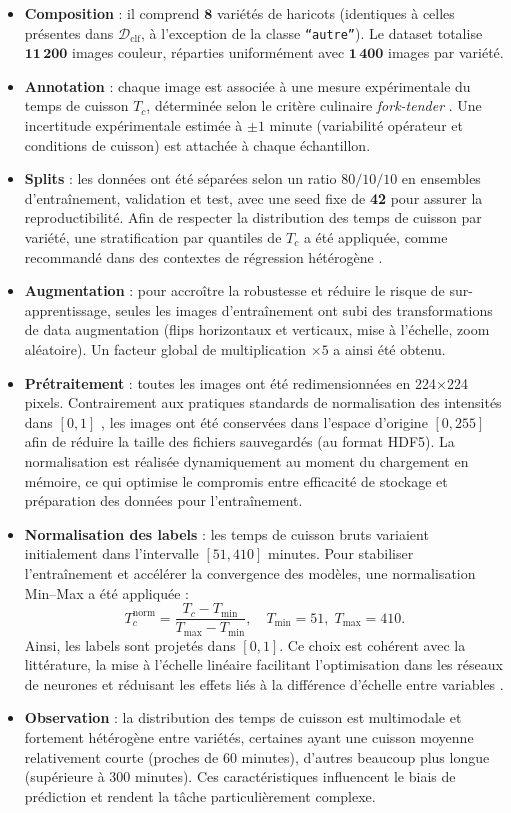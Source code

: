 \begin{itemize}
	\item \textbf{Composition} : il comprend \(\mathbf{8}\) variétés de haricots (identiques à celles présentes dans \(\mathcal{D}_{\text{clf}}\), à l’exception de la classe \texttt{``autre''}). Le dataset totalise \(\mathbf{11\,200}\) images couleur, réparties uniformément avec \(\mathbf{1\,400}\) images par variété.
	\item \textbf{Annotation} : chaque image est associée à une mesure expérimentale du temps de cuisson \(T_c\), déterminée selon le critère culinaire \emph{fork-tender} \cite{hall2017beanquality}. Une incertitude expérimentale estimée à \(\pm 1\) minute (variabilité opérateur et conditions de cuisson) est attachée à chaque échantillon.
	\item \textbf{Splits} : les données ont été séparées selon un ratio \(80/10/10\) en ensembles d’entraînement, validation et test, avec une seed fixe de \textbf{42} pour assurer la reproductibilité. Afin de respecter la distribution des temps de cuisson par variété, une stratification par quantiles de \(T_c\) a été appliquée, comme recommandé dans des contextes de régression hétérogène \cite{guyon2017analysis}.
	\item \textbf{Augmentation} : pour accroître la robustesse et réduire le risque de sur-apprentissage, seules les images d’entraînement ont subi des transformations de data augmentation (flips horizontaux et verticaux, mise à l’échelle, zoom aléatoire). Un facteur global de multiplication \(\times 5\) a ainsi été obtenu.
	\item \textbf{Prétraitement} : toutes les images ont été redimensionnées en 224×224 pixels. Contrairement aux pratiques standards de normalisation des intensités dans \([0,1]\) \cite{lecun2015deep}, les images ont été conservées dans l’espace d’origine \([0,255]\) afin de réduire la taille des fichiers sauvegardés (au format HDF5). La normalisation est réalisée dynamiquement au moment du chargement en mémoire, ce qui optimise le compromis entre efficacité de stockage et préparation des données pour l’entraînement.
	\item \textbf{Normalisation des labels} : les temps de cuisson bruts variaient initialement dans l’intervalle \([51, 410]\) minutes. Pour stabiliser l’entraînement et accélérer la convergence des modèles, une normalisation Min–Max a été appliquée :
	      \[
		      T_c^{\text{norm}} = \frac{T_c - T_{\min}}{T_{\max} - T_{\min}}, \quad T_{\min} = 51, \; T_{\max} = 410.
	      \]
	      Ainsi, les labels sont projetés dans \([0,1]\). Ce choix est cohérent avec la littérature, la mise à l’échelle linéaire facilitant l’optimisation dans les réseaux de neurones et réduisant les effets liés à la différence d’échelle entre variables \cite{bishop2006pattern}.
	\item \textbf{Observation} : la distribution des temps de cuisson est multimodale et fortement hétérogène entre variétés, certaines ayant une cuisson moyenne relativement courte (proches de 60 minutes), d’autres beaucoup plus longue (supérieure à 300 minutes). Ces caractéristiques influencent le biais de prédiction et rendent la tâche particulièrement complexe.
\end{itemize}

